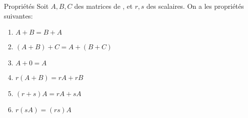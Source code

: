 \documentclass[a4paper]{article}
\begin{document}
\begin{parag}{Propriétés}
    Soit $A, B, C$ des matrices de , et $r, s$ des scalaires. On a les propriétés suivantes:
    \begin{enumerate}
        \item $A + B = B + A$
        \item $\left(A + B\right) + C = A + \left(B + C\right)$
        \item $A + 0 = A$
        \item $r\left(A + B\right) = rA + rB$
        \item $\left(r + s\right)A = rA + sA$
        \item $r\left(sA\right) = \left(rs\right)A$
    \end{enumerate}
\end{parag}
\end{document}
